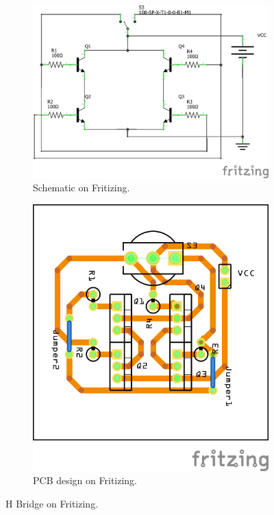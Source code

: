 \begin{figure}
\centering
\begin{subfigure}{\columnwidth}
\centering
\includegraphics[height=.65\textwidth]{img/ponteH_schem.png}
\caption{Schematic on Fritizing.}
\label{fig:schem_fritz}
\end{subfigure}

\begin{subfigure}{\columnwidth}
\centering
\includegraphics[height=.75\textwidth]{img/ponteH_pcb.png}
\caption{PCB design on Fritizing.}
\label{fig:pcb_fritz}
\end{subfigure}

\caption{H Bridge on Fritizing.}
\end{figure}


